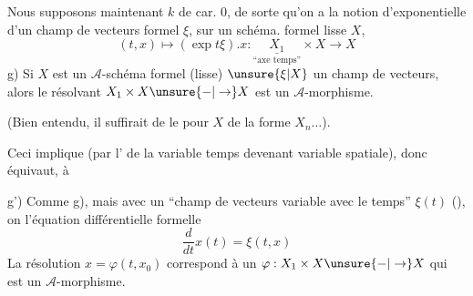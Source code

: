 Nous supposons maintenant $k$ de car. $0$, de sorte qu'on a la notion d'exponentielle d'un champ de vecteurs formel $\xi$, sur  un schéma. formel lisse $X$,
\[
(t,x)\longmapsto(\exp t\xi).x:\underset{\text{``axe temps''}}{\underline{X_1}}\times X\longrightarrow X
\]
g) Si $X$ est un $\mathcal A$-schéma formel (lisse) $\unsure{\xi|X}$ un champ de vecteurs, alors le résolvant $X_1\times X\unsure{-|\to}X$ est un $\mathcal A$-morphisme.

(Bien entendu, il suffirait de le  pour $X$ de la forme $X_n\ldots$).

Ceci implique (par l' de la variable temps devenant variable spatiale), donc équivaut, à

g') Comme g), mais avec un ``champ de vecteurs variable avec le temps'' $\xi(t)$
(), on  l'équation différentielle formelle
\[
\frac{d}{dt}x(t)=\xi(t,x)
\]
La résolution $x=\varphi(t,x_0)$ correspond à un $\varphi:X_1\times X\unsure{-|\to}X$ qui est un $\mathcal A$-morphisme.
